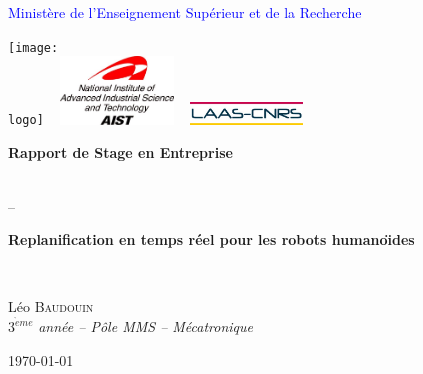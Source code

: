 \documentclass[a4paper,oneside,12pt]{article}
\newcommand{\leo}{L\'eo B\textsc{audouin}\xspace}
\newcommand{\eme}[1]{$#1^{\grave{e}me}$}
\newcommand{\logo}{images/Logo-IFMA.jpg}
\newcommand{\titre}{Replanification en temps réel pour les robots humano\"\i des}
\begin{document}
\thispagestyle{empty}
\textcolor{blue}{Ministère de l'Enseignement Supérieur et de la Recherche}\\
\vspace{5mm}
\begin{centering}

  \texttt{[image: \\logo]} ~
  \includegraphics[width=3.0cm]{images/Logo-AIST.jpg} ~
  \includegraphics[width=3.0cm]{images/Logo-LAAS-CNRS.jpg}

\end{centering}

\vspace{5mm}
\begin{center} 
\begin{large}
\textbf{Rapport de Stage en Entreprise}
\end{large}
\\\vspace{3mm}--\vspace{3mm}\\
\begin{Huge}
\textbf{\titre}
\end{Huge}
\\
\vspace{10mm}
\begin{LARGE}
\leo\\

\vspace{5mm}
\eme{3} \textit{année -- P\^ole MMS -- Mécatronique}\\
\end{LARGE}
\vspace{5mm}
\today
\end{center}
\end{document}
